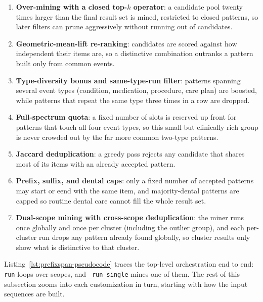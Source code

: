 \begin{enumerate}
    \item \label{cust:overmining} \textbf{Over-mining with a closed top-$k$ operator}: a candidate pool twenty times larger than the final result set is mined, restricted to closed patterns, so later filters can prune aggressively without running out of candidates.
    \item \label{cust:gml} \textbf{Geometric-mean-lift re-ranking}: candidates are scored against how independent their items are, so a distinctive combination outranks a pattern built only from common events.
    \item \label{cust:typediversity} \textbf{Type-diversity bonus and same-type-run filter}: patterns spanning several event types (condition, medication, procedure, care plan) are boosted, while patterns that repeat the same type three times in a row are dropped.
    \item \label{cust:fullspectrum} \textbf{Full-spectrum quota}: a fixed number of slots is reserved up front for patterns that touch all four event types, so this small but clinically rich group is never crowded out by the far more common two-type patterns.
    \item \label{cust:jaccard} \textbf{Jaccard deduplication}: a greedy pass rejects any candidate that shares most of its items with an already accepted pattern.
    \item \label{cust:caps} \textbf{Prefix, suffix, and dental caps}: only a fixed number of accepted patterns may start or eend with the same item, and majority-dental patterns are capped so routine dental care cannot fill the whole result set.
    \item \label{cust:dualscope} \textbf{Dual-scope mining with cross-scope deduplication}: the miner runs once globally and once per cluster (including the outlier group), and each per-cluster run drops any pattern already found globally, so cluster results only show what is distinctive to that cluster.
\end{enumerate}

Listing~\ref{lst:prefixspan-pseudocode} traces the top-level orchestration end to end: \texttt{run} loops over scopes, and \texttt{\_run\_single} mines one of them. The rest of this subsection zooms into each customization in turn, starting with how the input sequences are built.

\vspace{0.25cm}

